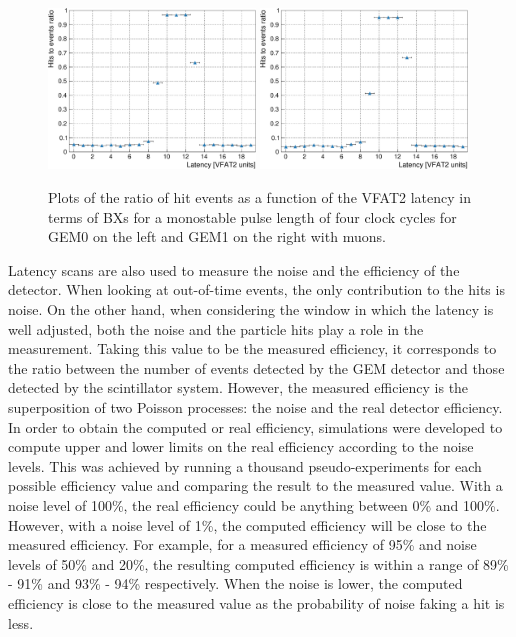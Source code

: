       \begin{figure}[h!]
        \centering
        \includegraphics[width=0.49\textwidth]{img/plots/cLatency_GEM0-crop}
        \includegraphics[width=0.49\textwidth]{img/plots/cLatency_GEM1-crop}
        \caption{Plots of the ratio of hit events as a function of the VFAT2 latency in terms of BXs for a monostable pulse length of four clock cycles for GEM0 on the left and GEM1 on the right with muons.}
        \label{fig:II-3-data-latency}
      \end{figure}

      Latency scans are also used to measure the noise and the efficiency of the detector. When looking at out-of-time events, the only contribution to the hits is noise. On the other hand, when considering the window in which the latency is well adjusted, both the noise and the particle hits play a role in the measurement. Taking this value to be the measured efficiency, it corresponds to the ratio between the number of events detected by the GEM detector and those detected by the scintillator system. However, the measured efficiency is the superposition of two Poisson processes: the noise and the real detector efficiency. In order to obtain the computed or real efficiency, simulations were developed to compute upper and lower limits on the real efficiency according to the noise levels. This was achieved by running a thousand pseudo-experiments for each possible efficiency value and comparing the result to the measured value. With a noise level of 100\%, the real efficiency could be anything between 0\% and 100\%. However, with a noise level of 1\%, the computed efficiency will be close to the measured efficiency. For example, for a measured efficiency of 95\% and noise levels of 50\% and 20\%, the resulting computed efficiency is within a range of 89\% - 91\% and 93\% - 94\% respectively. When the noise is lower, the computed efficiency is close to the measured value as the probability of noise faking a hit is less.

